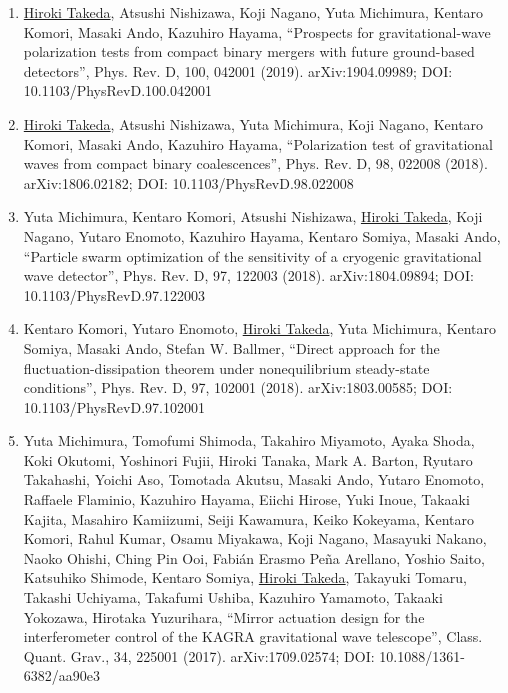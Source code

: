 \documentclass[uplatex, 11pt]{jsarticle}
\begin{document}
\begin{enumerate}
\item \uline{Hiroki Takeda}, Atsushi Nishizawa, Koji Nagano, Yuta Michimura, Kentaro Komori, Masaki Ando, Kazuhiro Hayama, “Prospects for gravitational-wave polarization tests from compact binary mergers with future ground-based detectors”, Phys. Rev. D, 100, 042001 (2019). arXiv:1904.09989; DOI: 10.1103/PhysRevD.100.042001
\item \uline{Hiroki Takeda}, Atsushi Nishizawa, Yuta Michimura, Koji Nagano, Kentaro Komori, Masaki Ando, Kazuhiro Hayama, “Polarization test of gravitational waves from compact binary coalescences”, Phys. Rev. D, 98, 022008 (2018). arXiv:1806.02182; DOI: 10.1103/PhysRevD.98.022008
\item Yuta Michimura, Kentaro Komori, Atsushi Nishizawa, \uline{Hiroki Takeda}, Koji Nagano, Yutaro Enomoto, Kazuhiro Hayama, Kentaro Somiya, Masaki Ando, “Particle swarm optimization of the sensitivity of a cryogenic gravitational wave detector”, Phys. Rev. D, 97, 122003 (2018). arXiv:1804.09894; DOI: 10.1103/PhysRevD.97.122003
\item Kentaro Komori, Yutaro Enomoto, \uline{Hiroki Takeda}, Yuta Michimura, Kentaro Somiya, Masaki Ando, Stefan W. Ballmer, “Direct approach for the fluctuation-dissipation theorem under nonequilibrium steady-state conditions”, Phys. Rev. D, 97, 102001 (2018). arXiv:1803.00585; DOI: 10.1103/PhysRevD.97.102001
\item Yuta Michimura, Tomofumi Shimoda, Takahiro Miyamoto, Ayaka Shoda, Koki Okutomi, Yoshinori Fujii, Hiroki Tanaka, Mark A. Barton, Ryutaro Takahashi, Yoichi Aso, Tomotada Akutsu, Masaki Ando, Yutaro Enomoto, Raffaele Flaminio, Kazuhiro Hayama, Eiichi Hirose, Yuki Inoue, Takaaki Kajita, Masahiro Kamiizumi, Seiji Kawamura, Keiko Kokeyama, Kentaro Komori, Rahul Kumar, Osamu Miyakawa, Koji Nagano, Masayuki Nakano, Naoko Ohishi, Ching Pin Ooi, Fabián Erasmo Peña Arellano, Yoshio Saito, Katsuhiko Shimode, Kentaro Somiya, \uline{Hiroki Takeda}, Takayuki Tomaru, Takashi Uchiyama, Takafumi Ushiba, Kazuhiro Yamamoto, Takaaki Yokozawa, Hirotaka Yuzurihara, “Mirror actuation design for the interferometer control of the KAGRA gravitational wave telescope”, Class. Quant. Grav., 34, 225001 (2017). arXiv:1709.02574; DOI: 10.1088/1361-6382/aa90e3
\end{enumerate}
\end{document}
